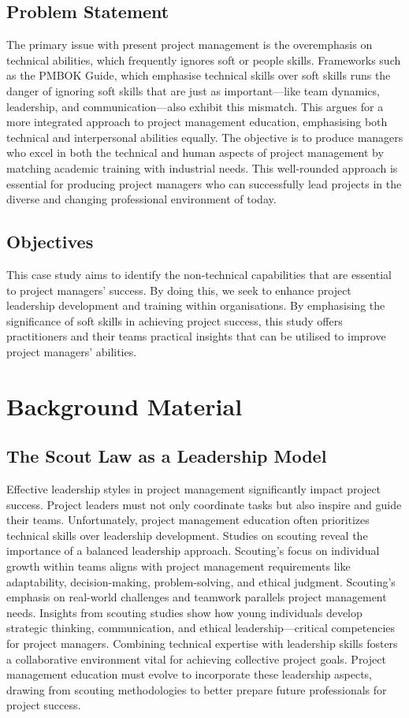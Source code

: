 \documentclass{article}
\begin{document}
\subsection{Problem Statement}
The primary issue with present project management is the overemphasis on technical abilities, which frequently ignores soft or people skills. Frameworks such as the PMBOK Guide, which emphasise technical skills over soft skills runs the danger of ignoring soft skills that are just as important—like team dynamics, leadership, and communication—also exhibit this mismatch. This argues for a more integrated approach to project management education, emphasising both technical and interpersonal abilities equally. The objective is to produce managers who excel in both the technical and human aspects of project management by matching academic training with industrial needs. This well-rounded approach is essential for producing project managers who can successfully lead projects in the diverse and changing professional environment of today.



\subsection{Objectives}
This case study aims to identify the non-technical capabilities that are essential to project managers' success. By doing this, we seek to enhance project leadership development and training within organisations. By emphasising the significance of soft skills in achieving project success, this study offers practitioners and their teams practical insights that can be utilised to improve project managers' abilities.

\section{Background Material}
\subsection{The Scout Law as a Leadership Model}

Effective leadership styles in project management significantly impact project success. Project leaders must not only coordinate tasks but also inspire and guide their teams. Unfortunately, project management education often prioritizes technical skills over leadership development. Studies on scouting reveal the importance of a balanced leadership approach. Scouting's focus on individual growth within teams aligns with project management requirements like adaptability, decision-making, problem-solving, and ethical judgment. Scouting's emphasis on real-world challenges and teamwork parallels project management needs. Insights from scouting studies show how young individuals develop strategic thinking, communication, and ethical leadership—critical competencies for project managers. Combining technical expertise with leadership skills fosters a collaborative environment vital for achieving collective project goals. Project management education must evolve to incorporate these leadership aspects, drawing from scouting methodologies to better prepare future professionals for project success.
\end{document}
